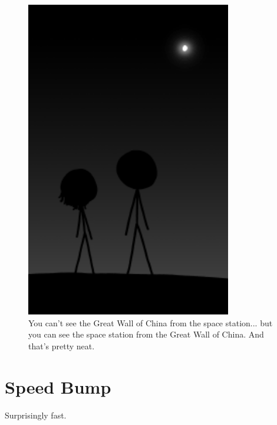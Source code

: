 {\begin{figure}[!htbp]
\centering
\includegraphics[scale=0.5, max width=0.8\textwidth]{imgs/a/60/sample_stars.png}
\caption{You can't see the Great Wall of China from the space station... but you can see the space station from the Great Wall of China. And that's pretty neat.}
\end{figure}

{
\chapter{Speed Bump}
}

\hfill{}

{Surprisingly fast.}

}
